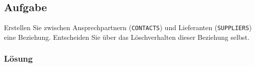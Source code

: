 \subsection{Aufgabe}
\label{sec:uebung_05.aufgabe_07}
Erstellen Sie zwischen Ansprechpartnern (\texttt{CONTACTS}) und Lieferanten (\texttt{SUPPLIERS}) eine Beziehung. Entscheiden Sie über das Löschverhalten dieser Beziehung selbst.

\subsubsection*{Lösung}
\label{sec:uebung_05.aufgabe_07.loesung}
